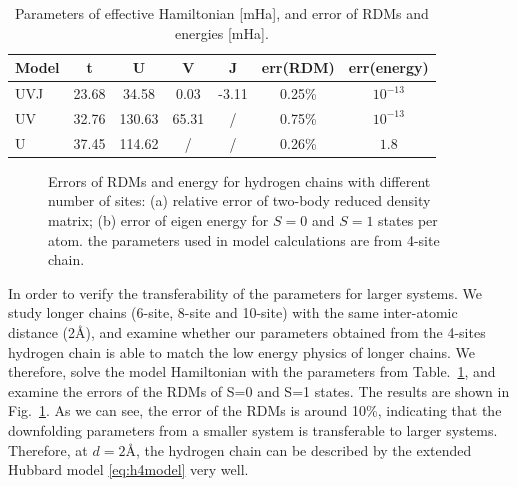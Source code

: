 \documentclass[prl,12pt,onecolumn,nofootinbib,notitlepage,english,superscriptaddress]{revtex4-1}
\begin{document}
\begin{table}[hbt]
\centering
\begin{tabular}{||l|c|c|c|c||c|c||}
\hline
Model & t & U & V & J & err(RDM) & err(energy)\\
\hline
\hline
UVJ & 23.68 & 34.58 & 0.03 & -3.11 & 0.25\% & $10^{-13}$\\
UV & 32.76 & 130.63 & 65.31 & / & 0.75\% & $10^{-13}$\\
U & 37.45 & 114.62 & / & / & 0.26\% & $1.8$\\
\hline
\end{tabular}
\caption{Parameters of effective Hamiltonian [mHa], and error of RDMs and energies [mHa].}\label{tab:effm_hchain}
\end{table}

\begin{figure}[hbt]
\centering
{}
\caption{Errors of RDMs and energy for hydrogen chains with different number of sites: (a) relative error of two-body reduced density matrix; (b) error of eigen energy for $S=0$ and $S=1$ states per atom. the parameters used in model calculations are from 4-site chain.}\label{fig:h4transfer}
\end{figure}
In order to verify the transferability of the parameters for larger systems. We study longer chains (6-site, 8-site and 10-site) with the same inter-atomic distance (2\AA), and examine whether our parameters obtained from the 4-sites hydrogen chain is able to match the low energy physics of longer chains. We therefore, solve the model Hamiltonian with the parameters
from Table.~\ref{tab:effm_hchain}, and examine the errors of the RDMs of S=0 and S=1 states. The results are
shown in Fig.~\ref{fig:h4transfer}. As we can see, the error of the RDMs is around 10\%, indicating that the downfolding parameters from a smaller system is transferable to larger systems.
Therefore, at $d=2$\AA, the hydrogen chain can be described by the extended Hubbard model \eqref{eq:h4model} very well. 
\end{document}
